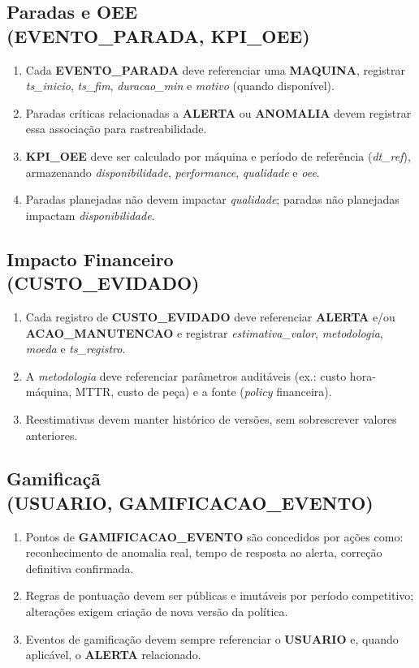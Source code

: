 \documentclass[a4paper,10pt]{article}
\let\oldtextbf\textbf
\renewcommand{\textbf}[1]{{\footnotesize\oldtextbf{#1}}}
\begin{document}
\subsection*{\small Paradas e OEE \\ (EVENTO\_PARADA, KPI\_OEE)}
\begin{enumerate}[label=RN-6.\arabic*, font=\footnotesize]
\item Cada \textbf{EVENTO\_PARADA} deve referenciar uma \textbf{MAQUINA}, registrar \textit{ts\_inicio}, \textit{ts\_fim}, \textit{duracao\_min} e \textit{motivo} (quando disponível).
\item Paradas críticas relacionadas a \textbf{ALERTA} ou \textbf{ANOMALIA} devem registrar essa associação para rastreabilidade.
\item \textbf{KPI\_OEE} deve ser calculado por máquina e período de referência (\textit{dt\_ref}), armazenando \textit{disponibilidade}, \textit{performance}, \textit{qualidade} e \textit{oee}.
\item Paradas planejadas não devem impactar \textit{qualidade}; paradas não planejadas impactam \textit{disponibilidade}.
\end{enumerate}

\subsection*{\small Impacto Financeiro \\ (CUSTO\_EVIDADO)}
\begin{enumerate}[label=RN-7.\arabic*, font=\footnotesize]
\item Cada registro de \textbf{CUSTO\_EVIDADO} deve referenciar \textbf{ALERTA} e/ou \textbf{ACAO\_MANUTENCAO} e registrar \textit{estimativa\_valor}, \textit{metodologia}, \textit{moeda} e \textit{ts\_registro}.
\item A \textit{metodologia} deve referenciar parâmetros auditáveis (ex.: custo hora-máquina, MTTR, custo de peça) e a fonte (\emph{policy} financeira).
\item Reestimativas devem manter histórico de versões, sem sobrescrever valores anteriores.
\end{enumerate}

\subsection*{\small Gamificaçã \\ (USUARIO, GAMIFICACAO\_EVENTO)}
\begin{enumerate}[label=RN-8.\arabic*,font=\footnotesize]
\item Pontos de \textbf{GAMIFICACAO\_EVENTO} são concedidos por ações como: reconhecimento de anomalia real, tempo de resposta ao alerta, correção definitiva confirmada.
\item Regras de pontuação devem ser públicas e imutáveis por período competitivo; alterações exigem criação de nova versão da política.
\item Eventos de gamificação devem sempre referenciar o \textbf{USUARIO} e, quando aplicável, o \textbf{ALERTA} relacionado.
\end{enumerate}
\end{document}
